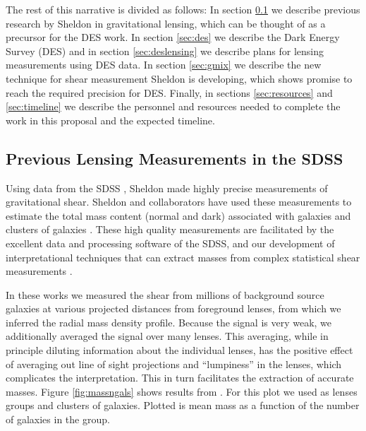\documentclass[12pt]{article}
\begin{document}
The rest of this narrative is divided as follows: In section \ref{sec:sdssold}
we describe previous research by Sheldon in gravitational lensing, which can be
thought of as a precursor for the DES work.  In section \ref{sec:des} we
describe the Dark Energy Survey (DES) and in section \ref{sec:deslensing} we
describe plans for lensing measurements using DES data.  In section
\ref{sec:gmix} we describe the new technique for shear measurement Sheldon is
developing, which shows promise to reach the required precision for DES. 
Finally, in sections \ref{sec:resources} and \ref{sec:timeline} we describe the
personnel and resources needed to complete the work in this proposal and the
expected timeline.


\subsection{Previous Lensing Measurements in the SDSS} \label{sec:sdssold}

Using data from the SDSS \cite{York00}, Sheldon made highly precise
measurements of gravitational shear. Sheldon and collaborators have used these
measurements to estimate the total mass content (normal and dark) associated
with galaxies and clusters of galaxies
\cite{fis00,Sheldon04,SheldonLensing07,JohnstonLensing07,SheldonM2L07}.  These
high quality measurements are facilitated by the excellent data and processing
software of the SDSS, and our development of interpretational techniques that
can extract masses from complex statistical shear measurements
\cite{JohnstonInvert07}.

In these works we measured the shear from millions of background source
galaxies at various projected distances from foreground lenses, from which we
inferred the radial mass density profile.  Because the signal is very weak, we
additionally averaged the signal over many lenses.  This averaging, while in
principle diluting information about the individual lenses, has the positive
effect of averaging out line of sight projections and ``lumpiness'' in the
lenses, which complicates the interpretation.  This in turn facilitates the
extraction of accurate masses.  Figure \ref{fig:massngals} shows results from
\cite{SheldonLensing07,JohnstonLensing07}. For this plot we used as lenses
groups and clusters of galaxies.  Plotted is mean mass as a function of the
number of galaxies in the group.  
\end{document}
